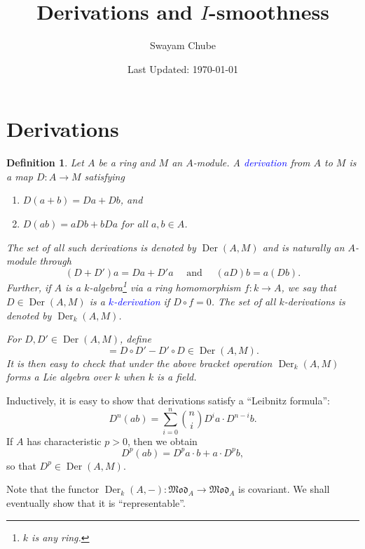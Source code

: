 \documentclass[10pt]{article}
\title{Derivations and $I$-smoothness}
\author{Swayam Chube}
\date{Last Updated: \today}
\theoremstyle{thmstyle}
\theoremstyle{defstyle}
\newtheorem{definition}[theorem]{Definition}
\newcommand{\define}[1]{\textcolor{blue}{\textit{#1}}}
\newcommand{\Der}{\operatorname{Der}}
\begin{document}
\maketitle

\section{Derivations}

\begin{definition}
    Let $A$ be a ring and $M$ an $A$-module. A \define{derivation} from $A$ to $M$ is a map $D\colon A\to M$ satisfying 
    \begin{enumerate}[label=(\roman*)]
        \item $D(a + b) = Da + Db$, and 
        \item $D(ab) = aDb + bDa$ for all $a,b\in A$.
    \end{enumerate}
    The set of all such derivations is denoted by $\Der(A, M)$ and is naturally an $A$-module through 
    \begin{equation*}
        (D + D')a = Da + D'a\quad\text{ and }\quad (aD)b = a(Db).
    \end{equation*}
    Further, if $A$ is a $k$-algebra\footnote{$k$ is any ring.} via a ring homomorphism $f\colon k\to A$, we say that $D\in\Der(A, M)$ is a \define{$k$-derivation} if $D\circ f = 0$. The set of all $k$-derivations is denoted by $\Der_k(A, M)$. 

    For $D, D'\in\Der(A, M)$, define 
    \begin{equation*}
        [D, D'] = D\circ D' - D'\circ D\in\Der(A, M).
    \end{equation*}
    It is then easy to check that under the above bracket operation $\Der_k(A, M)$ forms a Lie algebra over $k$ when $k$ is a field.
\end{definition}

Inductively, it is easy to show that derivations satisfy a ``Leibnitz formula'': 
\begin{equation*}
    D^n(ab) = \sum_{i = 0}^n \binom{n}{i}D^ia\cdot D^{n - i}b.
\end{equation*}
If $A$ has characteristic $p > 0$, then we obtain 
\begin{equation*}
    D^p(ab) = D^pa\cdot b + a\cdot D^pb,
\end{equation*}
so that $D^p\in\Der(A, M)$.

Note that the functor $\Der_k(A, -)\colon \mathfrak{Mod}_A\to\mathfrak{Mod}_A$ is covariant. We shall eventually show that it is ``representable''.
\end{document}
